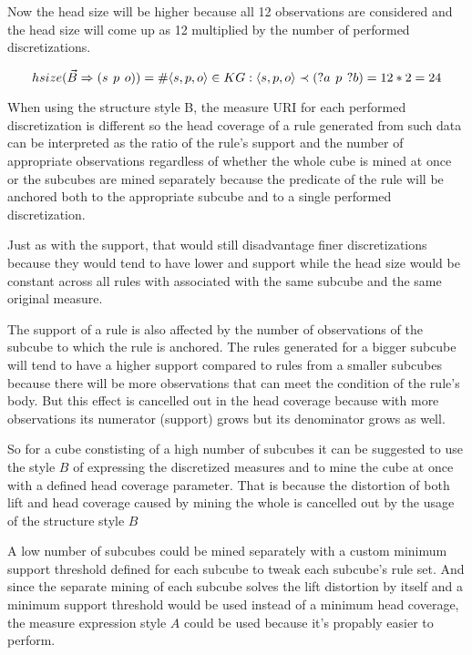 Now the head size will be higher because all 12 observations are considered and the head size will come up as 12 multiplied by the number of performed discretizations.

$$
hsize(\vec{B} \Rightarrow (s\hspace{0.4em}p\hspace{0.4em}o)) = \# \langle s,p,o\rangle \in KG: \langle s,p,o\rangle \prec (?a\hspace{0.4em}p\hspace{0.4em}?b) = 12 * 2 = 24
$$

When using the structure style B, the measure URI for each performed discretization is different so the head coverage of a rule generated from such data can be interpreted as the ratio of the rule's support and the number of appropriate observations regardless of whether the whole cube is mined at once or the subcubes are mined separately because the predicate of the rule will be anchored both to the appropriate subcube and to a single performed discretization.

Just as with the support, that would still disadvantage finer discretizations because they would tend to have lower and support while the head size would be constant across all rules with associated with the same subcube and the same original measure.

The support of a rule is also affected by the number of observations of the subcube to which the rule is anchored. The rules generated for a bigger subcube will tend to have a higher support compared to rules from a smaller subcubes because there will be more observations that can meet the condition of the rule's body. But this effect is cancelled out in the head coverage because with more observations its numerator (support) grows but its denominator grows as well. 

So for a cube constisting of a high number of subcubes it can be suggested to use the style $B$ of expressing the discretized measures and to mine the cube at once with a defined head coverage parameter. That is because the distortion of both lift and head coverage caused by mining the whole is cancelled out by the usage of the structure style $B$

A low number of subcubes could be mined separately with a custom minimum support threshold defined for each subcube to tweak each subcube's rule set. And since the separate mining of each subcube solves the lift distortion by itself and a minimum support threshold would be used instead of a minimum head coverage, the measure expression style $A$ could be used because it's propably easier to perform.

